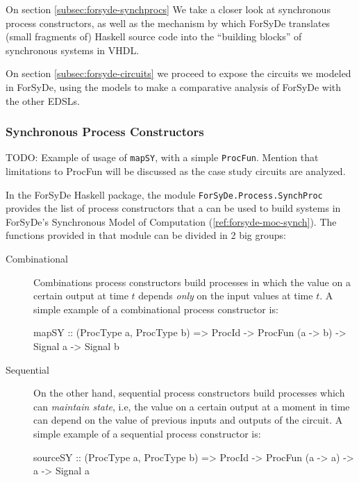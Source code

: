 \documentclass[a4paper]{article}
\begin{document}
                On section \ref{subsec:forsyde-synchprocs} We take a closer look at synchronous
                process constructors, as well as the mechanism by which ForSyDe translates (small
                fragments of) Haskell source code into the ``building blocks'' of synchronous
                systems in VHDL.

                On section \ref{subsec:forsyde-circuits} we proceed to expose the circuits we
                modeled in ForSyDe, using the models to make a comparative analysis of ForSyDe with
                the other EDSLs.

            \subsubsection{Synchronous Process Constructors}
            \label{subsubsec:forsyde-synchprocs}
                TODO: Example of usage of \texttt{mapSY}, with a simple \texttt{ProcFun}. Mention
                that limitations to ProcFun will be discussed as the case study circuits are
                analyzed.

                In the ForSyDe Haskell package, the module \texttt{ForSyDe.Process.SynchProc}
                provides the list of process constructors that a can be used to build systems in
                ForSyDe's Synchronous Model of Computation (\ref{ref:forsyde-moc-synch}). The
                functions provided in that module can be divided in 2 big groups:
                \begin{description}
                    \item[Combinational] Combinations process constructors build processes in which
                        the value on a certain output at time $t$ depends \emph{only} on the input
                        values at time $t$. A simple example of a combinational process constructor
                        is:
                        \begin{haskellcode}
        mapSY :: (ProcType a, ProcType b) => ProcId
              -> ProcFun (a -> b) -> Signal a -> Signal b
                        \end{haskellcode}

                    \item[Sequential] On the other hand, sequential process constructors build
                        processes which can \emph{maintain state}, i.e, the value on a certain output
                        at a moment in time can depend on the value of previous inputs and outputs
                        of the circuit. A simple example of a sequential process constructor is:
                        \begin{haskellcode}
        sourceSY :: (ProcType a, ProcType b) => ProcId
                 -> ProcFun (a -> a) -> a -> Signal a
                        \end{haskellcode}

                \end{description}
\end{document}
